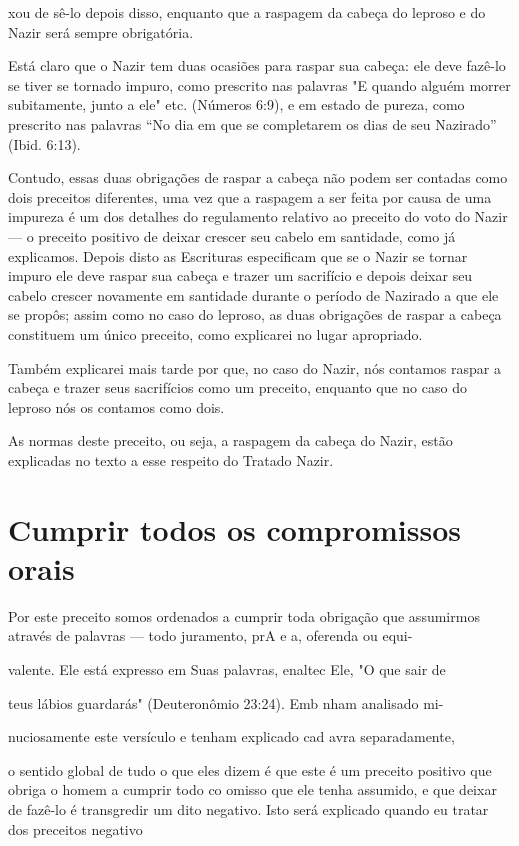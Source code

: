 xou de sê-lo depois disso, enquanto que a raspagem da cabeça do leproso
e do Nazir será sempre obrigatória.

Está claro que o Nazir tem duas ocasiões para raspar sua cabeça: ele
deve fazê-lo se tiver se tornado impuro, como prescrito nas palavras "E
quan­do alguém morrer subitamente, junto a ele" etc. (Números 6:9), e em
estado de pureza, como prescrito nas palavras ``No dia em que se
completarem os dias de seu Nazirado'' (Ibid. 6:13).

Contudo, essas duas obrigações de raspar a cabeça não podem ser contadas
como dois preceitos diferentes, uma vez que a raspagem a ser feita por
causa de uma impureza é um dos detalhes do regulamento relativo ao
pre­ceito do voto do Nazir --- o preceito positivo de deixar crescer seu
cabelo em santidade, como já explicamos. Depois disto as Escrituras
especificam que se o Nazir se tornar impuro ele deve raspar sua cabeça e
trazer um sacrifício e de­pois deixar seu cabelo crescer novamente em
santidade durante o período de Nazirado a que ele se propôs; assim como
no caso do leproso, as duas obriga­ções de raspar a cabeça constituem um
único preceito, como explicarei no lu­gar apropriado.

Também explicarei mais tarde por que, no caso do Nazir, nós conta­mos
raspar a cabeça e trazer seus sacrifícios como um preceito, enquanto que
no caso do leproso nós os contamos como dois.

As normas deste preceito, ou seja, a raspagem da cabeça do Nazir, estão
explicadas no texto a esse respeito do Tratado Nazir.

\section{Cumprir todos os compromissos orais}

Por este preceito somos ordenados a cumprir toda obrigação que
assumirmos através de palavras --- todo juramento, prA e a, oferenda ou
equi-

valente. Ele está expresso em Suas palavras, enaltec Ele, "O que sair de

teus lábios guardarás" (Deuteronômio 23:24). Emb nham analisado mi-

nuciosamente este versículo e tenham explicado cad avra separadamente,

o sentido global de tudo o que eles dizem é que este é um preceito
positivo que obriga o homem a cumprir todo co omisso que ele tenha
assumido, e que deixar de fazê-lo é transgredir um dito negativo. Isto
será explicado quando eu tratar dos preceitos negativo


